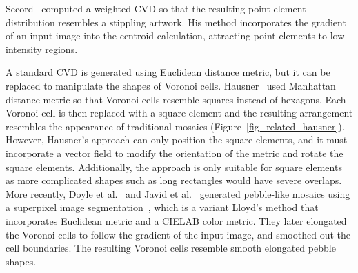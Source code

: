 \newtext
{
Secord~\cite{Secord2002} computed a weighted CVD so that the resulting point element distribution
resembles a stippling artwork.
His method incorporates the gradient of an input image into the centroid calculation, 
attracting point elements to low-intensity regions.
}

\newtext
{
A standard CVD is generated using Euclidean distance metric, but it can be replaced
to manipulate the shapes of Voronoi cells.
Hausner~\cite{Hausner2001} used Manhattan distance metric so that Voronoi cells resemble squares instead of hexagons.
Each Voronoi cell is then replaced with a square element and the resulting arrangement
resembles the appearance of traditional mosaics (Figure~\ref{fig_related_hausner}). 
However, Hausner's approach can only position the square elements, and it must
incorporate a vector field to modify the orientation of the metric
and rotate the square elements. 
Additionally, the approach is only suitable for square elements as
more complicated shapes such as long rectangles would have severe overlaps.
More recently, Doyle et al.~\cite{Doyle2019} and Javid et al.~\cite{Javid2019} generated pebble-like mosaics 
using a superpixel image segmentation~\cite{Achanta2012}, which is a variant Lloyd's method that incorporates Euclidean metric and a CIELAB color metric.
They later elongated the Voronoi cells to follow the gradient of the input image, 
and smoothed out the cell boundaries. 
The resulting Voronoi cells resemble smooth elongated pebble shapes.
}




